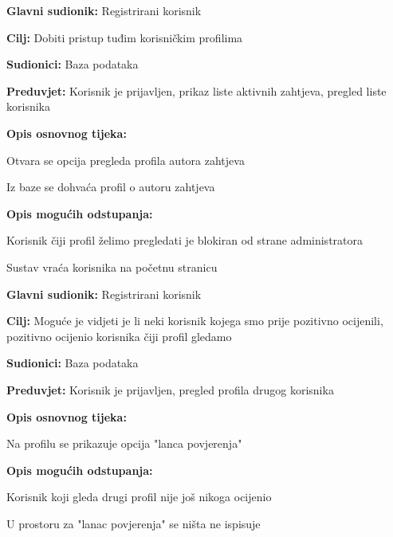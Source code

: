 \noindent {}
\begin{packed_item}
	\item \textbf{Glavni sudionik: } Registrirani korisnik
	\item  \textbf{Cilj:} Dobiti pristup tuđim korisničkim profilima
	\item  \textbf{Sudionici:} Baza podataka
	\item  \textbf{Preduvjet:} Korisnik je prijavljen, prikaz liste aktivnih zahtjeva, pregled liste korisnika
	\item  \textbf{Opis osnovnog tijeka:}
	\item[] \begin{packed_enum}
		\item Otvara se opcija pregleda profila autora zahtjeva
		\item Iz baze se dohvaća profil o autoru zahtjeva
	\end{packed_enum}
	\item  \textbf{Opis mogućih odstupanja:}
	\item[] \begin{packed_item}
		\item[1.a] Korisnik čiji profil želimo pregledati je blokiran od strane administratora
		\item[] \begin{packed_enum}
			\item Sustav vraća korisnika na početnu stranicu
		\end{packed_enum}
	\end{packed_item}
\end{packed_item}
\newpage
\noindent {}
\begin{packed_item}
	\item \textbf{Glavni sudionik: } Registrirani korisnik
	\item  \textbf{Cilj:} Moguće je vidjeti je li neki korisnik kojega smo prije pozitivno ocijenili, pozitivno ocijenio korisnika čiji profil gledamo 
	\item  \textbf{Sudionici:} Baza podataka
	\item  \textbf{Preduvjet:} Korisnik je prijavljen, pregled profila drugog korisnika
	\item  \textbf{Opis osnovnog tijeka:}
	\item[] \begin{packed_enum}
		\item Na profilu se prikazuje opcija "lanca povjerenja"
	\end{packed_enum}
	\item  \textbf{Opis mogućih odstupanja:}
	\item[] \begin{packed_item}
		\item[1.a] Korisnik koji gleda drugi profil nije još nikoga ocijenio
		\item[] \begin{packed_enum}
			\item U prostoru za "lanac povjerenja" se ništa ne ispisuje
		\end{packed_enum}
	\end{packed_item}
\end{packed_item}

